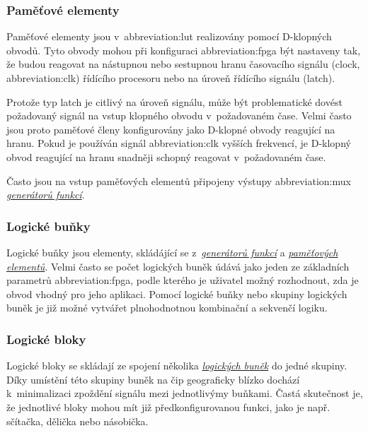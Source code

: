 \documentclass[a4paper, twoside, 11pt]{article}
\begin{document}
	\subsubsection{Paměťové elementy}\label{subsubsec:pametove-elementy}
		Paměťové elementy jsou v~\gls{abbreviation:lut} realizovány pomocí D-klopných obvodů. Tyto obvody mohou při konfiguraci \gls{abbreviation:fpga} být nastaveny tak, že budou reagovat na nástupnou nebo sestupnou hranu časovacího signálu (clock, \gls{abbreviation:clk}) řídícího procesoru nebo na úroveň řídícího signálu (latch). \cite{Sass2010}\par
		Protože typ latch je citlivý na úroveň signálu, může být problematické dovést požadovaný signál na vstup klopného obvodu v~požadovaném čase. Velmi často jsou proto paměťové členy konfigurovány jako D-klopné obvody reagující na hranu. Pokud je používán signál \gls{abbreviation:clk} vyšších frekvencí, je D-klopný obvod reagující na hranu snadněji schopný reagovat v~požadovaném čase. \cite{Sass2010}\par
		Často jsou na vstup paměťových elementů připojeny výstupy \gls{abbreviation:mux} \hyperref[subsubsec:generatory-funkci]{\textit{generátorů funkcí}}. \cite{Sass2010}

		\subsubsection{Logické buňky}\label{subsubsec:logicke-bunky}
			Logické buňky jsou elementy, skládájící se z~\hyperref[subsubsec:generatory-funkci]{\textit{generátorů funkcí}} a \hyperref[subsubsec:pametove-elementy]{\textit{paměťových elementů}}. Velmi často se počet logických buněk údává jako jeden ze základních parametrů \gls{abbreviation:fpga}, podle kterého je uživatel možný rozhodnout, zda je obvod vhodný pro jeho aplikaci. Pomocí logické buňky nebo skupiny logických buněk je již možné vytvářet plnohodnotnou kombinační a sekvenčí logiku. \cite{Sass2010}

			\newpage
		\subsubsection{Logické bloky}\label{subsubsec:logicke-bloky}
			Logické bloky se skládají ze spojení několika \hyperref[subsubsec:logicke-bunky]{\textit{logických buněk}} do jedné skupiny. Díky umístění této skupiny buněk na čip geograficky blízko dochází k~minimalizaci zpoždění signálu mezi jednotlivýmy buňkami. Častá skutečnost je, že jednotlivé bloky mohou mít již předkonfigurovanou funkci, jako je např. sčítačka, dělička nebo násobička. \cite{Sass2010}
\end{document}
